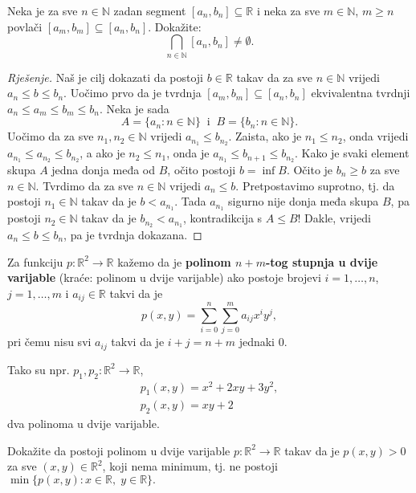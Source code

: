 \begin{exercise}
\label{Cantor}
Neka je za sve $n\in \mathbb{N}$ zadan segment $[a_n, b_n]\subseteq \mathbb{R}$ i neka za sve $m\in \mathbb{N}$, $m\geq n$ povlači $[a_m, b_m]\subseteq [a_n, b_n]$. Dokažite:
$$\bigcap_{n\in \mathbb{N}}{[a_n, b_n]}\neq \emptyset.$$
\end{exercise}
\begin{proof}[Rješenje]
Naš je cilj dokazati da postoji $b\in \mathbb{R}$ takav da za sve $n\in \mathbb{N}$ vrijedi $a_n\leq b\leq b_n$. Uočimo prvo da je tvrdnja $[a_m, b_m]\subseteq [a_n, b_n]$ ekvivalentna tvrdnji $a_n\leq a_m\leq b_m\leq b_n$. Neka je sada $$A=\{a_n : n\in \mathbb{N}\}\;\;\text{i}\;\;B=\{b_n : n\in \mathbb{N}\}.$$ Uočimo da za sve $n_1, n_2\in \mathbb{N}$ vrijedi $a_{n_1}\leq b_{n_2}$. Zaista, ako je $n_1\leq n_2$, onda vrijedi $a_{n_1}\leq a_{n_2}\leq b_{n_2}$, a ako je $n_2\leq n_1$, onda je $a_{n_1}\leq b_{n+1}\leq b_{n_2}$. Kako je svaki element skupa $A$ jedna donja međa od $B$, očito postoji $b=\inf{B}$. Očito je $b_n\geq b$ za sve $n\in \mathbb{N}$. Tvrdimo da za sve $n\in \mathbb{N}$ vrijedi $a_n\leq b$. Pretpostavimo suprotno, tj. da postoji $n_1\in \mathbb{N}$ takav da je $b<a_{n_1}$. Tada $a_{n_1}$ sigurno nije donja međa skupa $B$, pa postoji $n_2\in \mathbb{N}$ takav da je $b_{n_2}<a_{n_1}$, kontradikcija s $A\leq B$! Dakle, vrijedi $a_n\leq b\leq b_n$, pa je tvrdnja dokazana.
\end{proof}
\begin{definition}
Za funkciju $p : \mathbb{R}^2\to \mathbb{R}$ kažemo da je \textbf{polinom $n+m$-tog stupnja u dvije varijable} (kraće: polinom u dvije varijable) ako postoje brojevi $i=1, \dots, n$, $j=1,\dots, m$ i $a_{ij}\in \mathbb{R}$ takvi da je
$$p(x, y)=\sum_{i=0}^n{\sum_{j=0}^m{{a_{ij}}x^{i}y^j}},$$
pri čemu nisu svi $a_{ij}$ takvi da je $i+j=n+m$ jednaki $0$.
\end{definition}
Tako su npr. $p_1, p_2 : \mathbb{R}^2\to \mathbb{R}$,
\begin{gather*}
p_1(x, y)=x^2+2xy+3y^2,\\
p_2(x, y)=xy+2
\end{gather*}
dva polinoma u dvije varijable.
\begin{exercise}
Dokažite da postoji polinom u dvije varijable $p : \mathbb{R}^2\to \mathbb{R}$ takav da je $p(x, y)>0$ za sve $(x, y)\in \mathbb{R}^2$, koji nema minimum, tj. ne postoji $\min\{p(x, y) : x\in \mathbb{R},\; y\in \mathbb{R}\}.$
\end{exercise}
